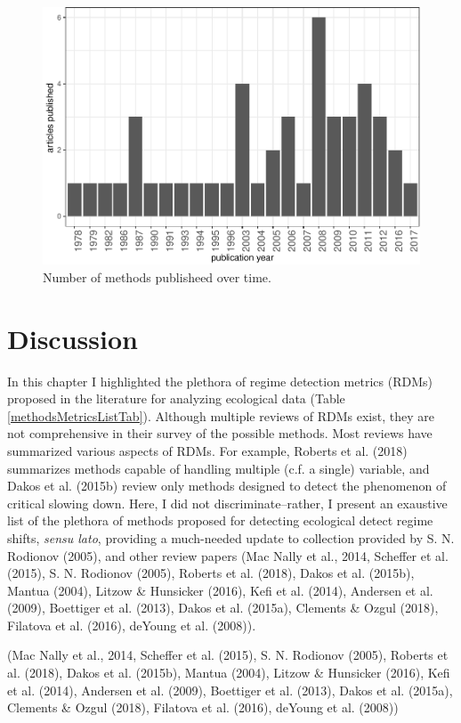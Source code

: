 \documentclass[12pt,twoside,openany]{reedthesis}
\begin{document}
\begin{figure}
\centering
\includegraphics{_myDissertation_files/figure-latex/jrnlYearFig-1.pdf}
\caption{\label{fig:jrnlYearFig}Number of methods publisheed over time.}
\end{figure}
\section{Discussion}\label{discussion}

In this chapter I highlighted the plethora of regime detection metrics
(RDMs) proposed in the literature for analyzing ecological data (Table
\ref{methodsMetricsListTab}). Although multiple reviews of RDMs exist,
they are not comprehensive in their survey of the possible methods. Most
reviews have summarized various aspects of RDMs. For example, Roberts et
al. (2018) summarizes methods capable of handling multiple (c.f. a
single) variable, and Dakos et al. (2015b) review only methods designed
to detect the phenomenon of critical slowing down. Here, I did not
discriminate--rather, I present an exaustive list of the plethora of
methods proposed for detecting ecological detect regime shifts,
\emph{sensu lato}, providing a much-needed update to collection provided
by S. N. Rodionov (2005), and other review papers (Mac Nally et al.,
2014, Scheffer et al. (2015), S. N. Rodionov (2005), Roberts et al.
(2018), Dakos et al. (2015b), Mantua (2004), Litzow \& Hunsicker (2016),
Kefi et al. (2014), Andersen et al. (2009), Boettiger et al. (2013),
Dakos et al. (2015a), Clements \& Ozgul (2018), Filatova et al. (2016),
deYoung et al. (2008)).

(Mac Nally et al., 2014, Scheffer et al. (2015), S. N. Rodionov (2005),
Roberts et al. (2018), Dakos et al. (2015b), Mantua (2004), Litzow \&
Hunsicker (2016), Kefi et al. (2014), Andersen et al. (2009), Boettiger
et al. (2013), Dakos et al. (2015a), Clements \& Ozgul (2018), Filatova
et al. (2016), deYoung et al. (2008))
\end{document}
